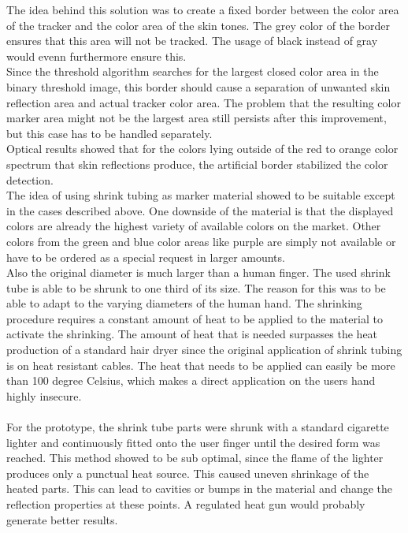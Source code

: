 The idea behind this solution was to create a fixed border between the color area of the tracker and the color area of the skin tones. The grey color of the border ensures that this area will not be tracked. The usage of black instead of gray would evenn furthermore ensure this. 
\\Since the threshold algorithm searches for the largest closed color area in the binary threshold image, this border should cause a separation of unwanted skin reflection area and actual tracker color area. The problem that the resulting color marker area might not be the largest area still persists after this improvement, but this case has to be handled separately.
\\Optical results showed that for the colors lying outside of the red to orange color spectrum that skin reflections produce, the artificial border stabilized the color detection.
\\The idea of using shrink tubing as marker material showed to be suitable except in the cases described above. One downside of the material is that the displayed colors are already the highest variety of available colors on the market. Other colors from the green and blue color areas like purple are simply not available or have to be ordered as a special request in larger amounts.
\\Also the original diameter is much larger than a human finger. The used shrink tube is able to be shrunk to one third of its size. The reason for this was to be able to adapt to the varying diameters of the human hand. The shrinking procedure requires a constant amount of heat to be applied to the material to activate the shrinking. The amount of heat that is needed surpasses the heat production of a standard hair dryer since the original application of shrink tubing is on heat resistant cables. The heat that needs to be applied can easily be more than 100 degree Celsius, which makes a direct application on the users hand highly insecure.
\\\\For the prototype, the shrink tube parts were shrunk with a standard cigarette lighter and continuously fitted onto the user finger until the desired form was reached. This method showed to  be sub optimal, since the flame of the lighter produces only a punctual heat source. This caused uneven shrinkage of the heated parts. This can lead to cavities or bumps in the material and change the reflection properties at these points. A regulated heat gun would probably generate better results.
